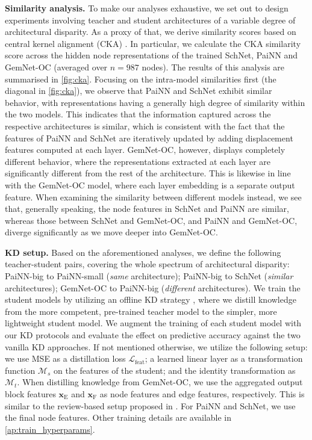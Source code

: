 \documentclass{article}
\newcommand{\loss}{\mathcal{L}}
\begin{document}
\textbf{Similarity analysis.} 
To make our analyses exhaustive, we set out to design experiments involving teacher and student architectures of a variable degree of architectural disparity. As a proxy of that, we derive similarity scores based on central kernel alignment (CKA) \cite{kornblith2019similarity, raghu2021do}. In particular, we calculate the CKA similarity score across the hidden node representations of the trained SchNet, PaiNN and GemNet-OC (averaged over $n=987$ nodes). The results of this analysis are summarised in \cref{fig:cka}.
Focusing on the intra-model similarities first (the diagonal in \cref{fig:cka}), we observe that PaiNN and SchNet exhibit similar behavior, with representations having a generally high degree of similarity within the two models.
This indicates that the information captured across the respective architectures is similar, which is consistent with the fact that the features of PaiNN and SchNet are iteratively updated by adding displacement features computed at each layer. GemNet-OC, however, displays completely different behavior, where the representations extracted at each layer are significantly different from the rest of the architecture. 
This is likewise in line with the GemNet-OC model, where each layer embedding is a separate output feature. When examining the similarity between different models instead, we see that, generally speaking, the node features in SchNet and PaiNN are similar, whereas those between SchNet and GemNet-OC, and PaiNN and GemNet-OC, diverge significantly as we move deeper into GemNet-OC. 

\textbf{KD setup.}
Based on the aforementioned analyses, we define the following teacher-student pairs, covering the whole spectrum of architectural disparity: PaiNN-big to PaiNN-small (\emph{same} architecture); PaiNN-big to SchNet (\emph{similar} architectures); GemNet-OC to PaiNN-big (\emph{different} architectures). We train the student models by utilizing an offline KD strategy \cite{gou2021knowledge}, where we distill knowledge from the more competent, pre-trained teacher model to the simpler, more lightweight student model. We augment the training of each student model with our KD protocols and evaluate the effect on predictive accuracy against the two vanilla KD approaches. 
If not mentioned otherwise, we utilize the following setup: we use MSE as a distillation loss $\loss_{\text{feat}}$; a learned linear layer as a transformation function $\mathcal{M}_s$ on the features of the student; and the identity transformation as $\mathcal{M}_t$. When distilling knowledge from GemNet-OC, we use the aggregated output block features $\boldsymbol{x}_\text{E}$ and $\boldsymbol{x}_\text{F}$ as node features and edge features, respectively. This is similar to the review-based setup proposed in \cite{chen2021distilling}. For PaiNN and SchNet, we use the final node features. Other training details are available in \cref{ap:train_hyperparams}.
\end{document}

